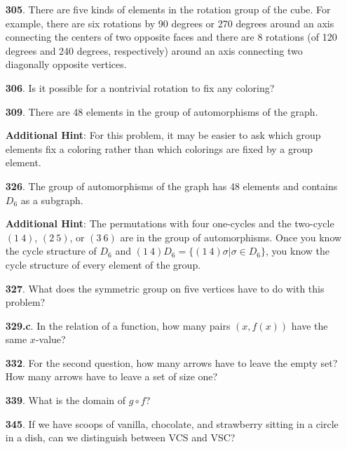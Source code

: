 \documentclass[10pt,]{book}
\theoremstyle{plain}
\theoremstyle{definition}
\theoremstyle{definition}
\numberwithin{equation}{chapter}
\begin{document}
\begin{itemize}[itemsep=1em]
\item[\textbf{305}.]There are five kinds of elements in the rotation group of the cube. For example, there are six rotations by 90 degrees or 270 degrees around an axis connecting the centers of two opposite faces and there are 8 rotations (of 120 degrees and 240 degrees, respectively) around an axis connecting two diagonally opposite vertices.%

\item[\textbf{306}.]Is it possible for a nontrivial rotation to fix any coloring?%

\item[\textbf{309}.]There are 48 elements in the group of automorphisms of the graph.%

\par\smallskip
\noindent\textbf{Additional Hint}: For this problem, it may be easier to ask which group elements fix a coloring rather than which colorings are fixed by a group element.%

\item[\textbf{326}.]The group of automorphisms of the graph has 48 elements and contains \(D_6\) as a subgraph.%

\par\smallskip
\noindent\textbf{Additional Hint}: The permutations with four one-cycles and the two-cycle \((1\ 4)\), \((2\ 5)\), or \((3\ 6)\) are in the group of automorphisms. Once you know the cycle structure of \(D_6\) and \((1\ 4)D_6 = \{(1\ 4)\sigma | \sigma \in D_6\}\), you know the cycle structure of every element of the group.%

\item[\textbf{327}.]What does the symmetric group on five vertices have to do with this problem?%

\item[\textbf{329.c}.]In the relation of a function, how many pairs \((x, f (x))\) have the same \(x\)-value?%

\item[\textbf{332}.]For the second question, how many arrows have to leave the empty set? How many arrows have to leave a set of size one?%

\item[\textbf{339}.]What is the domain of \(g \circ f\)?%

\item[\textbf{345}.]If we have scoops of vanilla, chocolate, and strawberry sitting in a circle in a dish, can we distinguish between VCS and VSC?%


\end{itemize}
\end{document}
